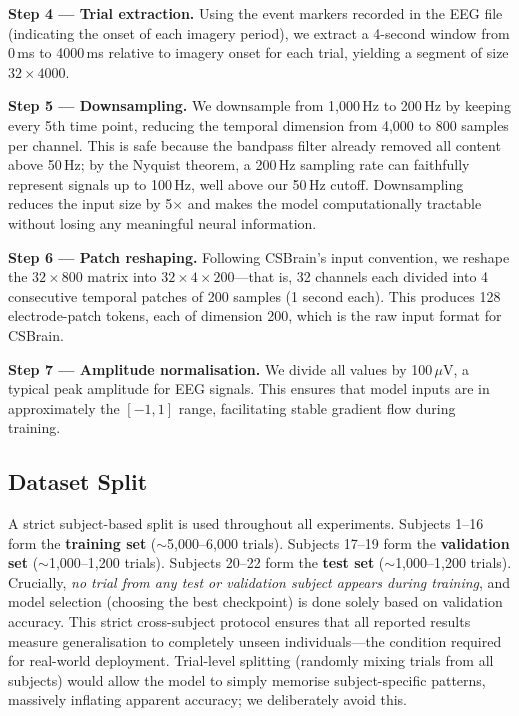 \documentclass{article}
\begin{document}
\textbf{Step 4 --- Trial extraction.} Using the event markers recorded in the EEG file (indicating the onset of each imagery period), we extract a 4-second window from 0\,ms to 4000\,ms relative to imagery onset for each trial, yielding a segment of size $32 \times 4000$.

\textbf{Step 5 --- Downsampling.} We downsample from 1,000\,Hz to 200\,Hz by keeping every 5th time point, reducing the temporal dimension from 4,000 to 800 samples per channel. This is safe because the bandpass filter already removed all content above 50\,Hz; by the Nyquist theorem, a 200\,Hz sampling rate can faithfully represent signals up to 100\,Hz, well above our 50\,Hz cutoff. Downsampling reduces the input size by 5$\times$ and makes the model computationally tractable without losing any meaningful neural information.

\textbf{Step 6 --- Patch reshaping.} Following CSBrain's input convention, we reshape the $32 \times 800$ matrix into $32 \times 4 \times 200$---that is, 32 channels each divided into 4 consecutive temporal patches of 200 samples (1 second each). This produces 128 electrode-patch tokens, each of dimension 200, which is the raw input format for CSBrain.

\textbf{Step 7 --- Amplitude normalisation.} We divide all values by 100\,$\mu$V, a typical peak amplitude for EEG signals. This ensures that model inputs are in approximately the $[-1, 1]$ range, facilitating stable gradient flow during training.

\subsection{Dataset Split}

A strict subject-based split is used throughout all experiments. Subjects 1--16 form the \textbf{training set} ($\sim$5,000--6,000 trials). Subjects 17--19 form the \textbf{validation set} ($\sim$1,000--1,200 trials). Subjects 20--22 form the \textbf{test set} ($\sim$1,000--1,200 trials). Crucially, \emph{no trial from any test or validation subject appears during training}, and model selection (choosing the best checkpoint) is done solely based on validation accuracy. This strict cross-subject protocol ensures that all reported results measure generalisation to completely unseen individuals---the condition required for real-world deployment. Trial-level splitting (randomly mixing trials from all subjects) would allow the model to simply memorise subject-specific patterns, massively inflating apparent accuracy; we deliberately avoid this.
\end{document}
